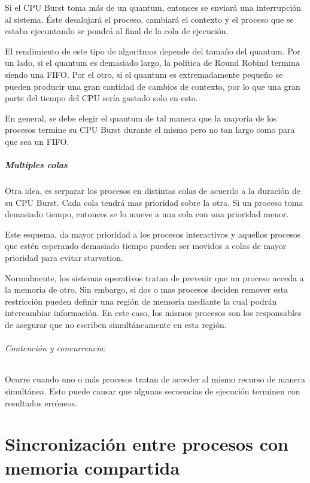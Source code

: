 	Si el CPU Burst toma más de un quantum, entonces se enviará una interrupción al sistema. Éste desalojará el proceso, cambiará el contexto y el proceso que se estaba ejecuntando se pondrá al final de la cola de ejecución.
	
	El rendimiento de este tipo de algoritmos depende del tamaño del quantum. Por un lado, si el quantum es demasiado largo, la política de Round Robind termina siendo una FIFO. Por el otro, si el quantum es extremadamente pequeño se pueden producir una gran cantidad de cambios de contexto, por lo que una gran parte del tiempo del CPU sería gastado solo en esto.
	
	En general, se debe elegir el quantum de tal manera que la mayoria de los procesos termine su CPU Burst durante el mismo pero no tan largo como para que sea un FIFO.
	
	\subsubsection{Multiples colas}
	Otra idea, es serparar los procesos en distintas colas de acuerdo a la duración de su CPU Burst. Cada cola tendrá mas prioridad sobre la otra. Si un proceso toma demasiado tiempo, entonces se lo mueve a una cola con una prioridad menor. 
	
	Este esquema, da mayor prioridad a los procesos interactivos y aquellos procesos que estén esperando demasiado tiempo pueden ser movidos a colas de mayor prioridad para evitar starvation.

\newpage
Normalmente, los sistemas operativos tratan de prevenir que un proceso acceda a la memoria de otro. Sin embargo, si dos o mas procesos deciden remover esta restricción pueden definir una región de memoria mediante la cual podrán intercambiar información. En este caso, los mismos procesos son los responsables de asegurar que no escriben simultáneamente en esta región.

\paragraph{Contención y concurrencia:} Ocurre cuando uno o más procesos tratan de acceder al mismo recurso de manera simultánea. Esto puede causar que algunas secuencias de ejecución terminen con resultados erróneos.

\printbibliography[keyword=scheduling,title=Bibliografía]

\newpage
\part{Sincronización entre procesos con memoria compartida}
